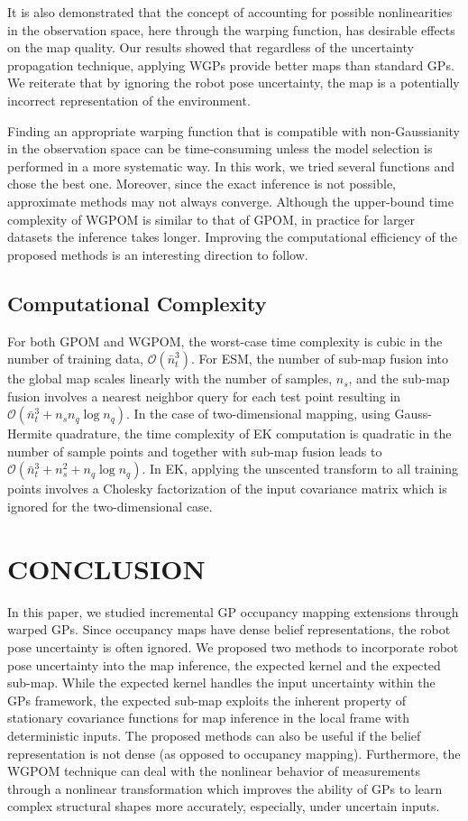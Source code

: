 \documentclass[letterpaper, 10 pt, journal, twoside]{IEEEtran}  %
\begin{document}
It is also demonstrated that the concept of accounting for possible nonlinearities in the observation space, here through the warping function, has desirable effects on the map quality. Our results showed that regardless of the uncertainty propagation technique, applying WGPs provide better maps than standard GPs. We reiterate that by ignoring the robot pose uncertainty, the map is a potentially incorrect representation of the environment.

Finding an appropriate warping function that is compatible with non-Gaussianity in the observation space can be time-consuming unless the model selection is performed in a more systematic way. In this work, we tried several functions and chose the best one. Moreover, since the exact inference is not possible, approximate methods may not always converge. Although the upper-bound time complexity of WGPOM is similar to that of GPOM, in practice for larger datasets the inference takes longer. Improving the computational efficiency of the proposed methods is an interesting direction to follow.

\subsection{Computational Complexity}
\label{subsec:complexity}
For both GPOM and WGPOM, the worst-case time complexity is cubic in the number of training data, $\mathcal{O}(\bar{n}_{t}^3)$. For ESM, the number of sub-map fusion into the global map scales linearly with the number of samples, $n_s$, and the sub-map fusion involves a nearest neighbor query for each test point resulting in $\mathcal{O}(\bar{n}_{t}^3 + n_s n_{q} \log n_{q})$. In the case of two-dimensional mapping, using Gauss-Hermite quadrature, the time complexity of EK computation is quadratic in the number of sample points and together with sub-map fusion leads to $\mathcal{O}(\bar{n}_{t}^3 + n_s^2 + n_{q} \log n_{q})$. In EK, applying the unscented transform to all training points involves a Cholesky factorization of the input covariance matrix which is ignored for the two-dimensional case.


\section{CONCLUSION}
\label{sec:conclusion}

In this paper, we studied incremental GP occupancy mapping extensions through warped GPs. Since occupancy maps have dense belief representations, the robot pose uncertainty is often ignored. We proposed two methods to incorporate robot pose uncertainty into the map inference, the expected kernel and the expected sub-map. While the expected kernel handles the input uncertainty within the GPs framework, the expected sub-map exploits the inherent property of stationary covariance functions for map inference in the local frame with deterministic inputs. The proposed methods can also be useful if the belief representation is not dense (as opposed to occupancy mapping). Furthermore, the WGPOM technique can deal with the nonlinear behavior of measurements through a nonlinear transformation which improves the ability of GPs to learn complex structural shapes more accurately, especially, under uncertain inputs.
\end{document}
